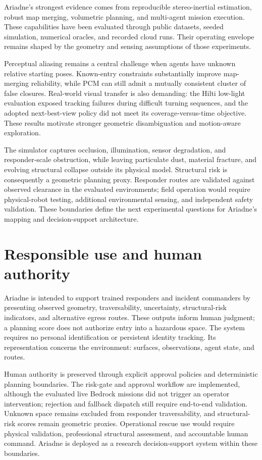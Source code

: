 \documentclass[10pt,a4paper]{article}
\begin{document}
Ariadne's strongest evidence comes from reproducible stereo-inertial
estimation, robust map merging, volumetric planning, and multi-agent
mission execution. These capabilities have been evaluated through
public datasets, seeded simulation, numerical oracles, and recorded
cloud runs. Their operating envelope remains shaped by the geometry
and sensing assumptions of those experiments.

Perceptual aliasing remains a central challenge when agents have
unknown relative starting poses. Known-entry constraints substantially
improve map-merging reliability, while PCM can still admit a mutually
consistent cluster of false closures. Real-world visual transfer is
also demanding: the Hilti low-light evaluation exposed tracking
failures during difficult turning sequences, and the adopted
next-best-view policy did not meet its coverage-versus-time objective.
These results motivate stronger geometric disambiguation and
motion-aware exploration.

The simulator captures occlusion, illumination, sensor degradation,
and responder-scale obstruction, while leaving particulate dust,
material fracture, and evolving structural collapse outside its
physical model. Structural risk is consequently a geometric
planning proxy. Responder routes are validated against observed
clearance in the evaluated environments; field operation would
require physical-robot testing, additional environmental sensing,
and independent safety validation. These boundaries define the
next experimental questions for Ariadne's mapping and
decision-support architecture.

\section{Responsible use and human authority}

Ariadne is intended to support trained responders and incident
commanders by presenting observed geometry, traversability,
uncertainty, structural-risk indicators, and alternative egress
routes. These outputs inform human judgment; a planning score
does not authorize entry into a hazardous space. The system
requires no personal identification or persistent identity
tracking. Its representation concerns the environment:
surfaces, observations, agent state, and routes.

Human authority is preserved through explicit approval policies
and deterministic planning boundaries. The risk-gate and approval
workflow are implemented, although the evaluated live Bedrock
missions did not trigger an operator intervention; rejection
and fallback dispatch still require end-to-end validation.
Unknown space remains excluded from responder traversability,
and structural-risk scores remain geometric proxies.
Operational rescue use would require physical validation,
professional structural assessment, and accountable human
command. Ariadne is deployed as a research decision-support
system within these boundaries.
\end{document}
